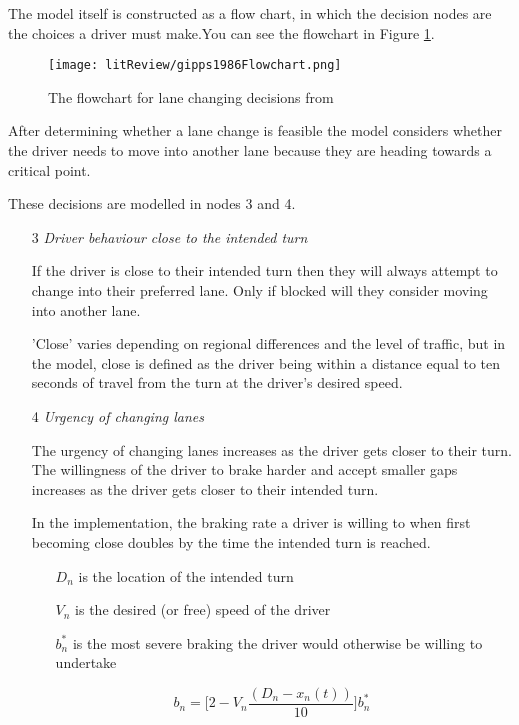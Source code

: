 The model itself is constructed as a flow chart, in which the decision nodes are the choices a driver must make.You can see the flowchart in Figure \ref{fig:Gipps1986Flowchart}.

\begin{figure}[htb]
\texttt{[image: litReview/gipps1986Flowchart.png]}
\caption{The flowchart for lane changing decisions from \citep{Gipps1986}}
\label{fig:Gipps1986Flowchart}
\end{figure}

After determining whether a lane change is feasible the model considers whether the driver needs to move into another lane because they are heading towards a critical point.

These decisions are modelled in nodes 3 and 4.

\begin{enumerate}
\item[3] \textit{Driver behaviour close to the intended turn}

If the driver is close to their intended turn then they will always attempt to change into their preferred lane. Only if blocked will they consider moving into another lane. 

'Close' varies depending on regional differences and the level of traffic, but in the model, close is defined as the driver being within a distance equal to ten seconds of travel from the turn at the driver's desired speed.

\item[4] \textit{Urgency of changing lanes}

The urgency of changing lanes increases as the driver gets closer to their turn. The willingness of the driver to brake harder and accept smaller gaps increases as the driver gets closer to their intended turn.

In the implementation, the braking rate a driver is willing to when first becoming close doubles by the time the intended turn is reached. 

\begin{itemize}
\item[$D_n$] is the location of the intended turn
\item[$V_n$] is the desired (or free) speed of the driver
\item[$b_n^*$] is the most severe braking the driver would otherwise be willing to undertake
\end{itemize}

\begin{equation}
b_n = \Biggl[2 - V_n\frac{(D_n - x_n(t))}{10}\Biggr]b_n^*
\end{equation}

\end{enumerate}

